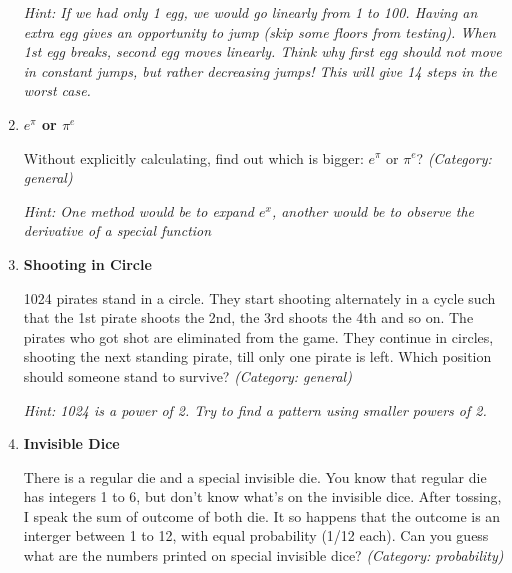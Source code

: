 \begin{enumerate}
\small\emph{Hint: If we had only 1 egg, we would go linearly from 1 to 100. Having an extra egg gives an opportunity to jump (skip some floors from testing). When 1st egg breaks, second egg moves linearly. Think why first egg should not move in constant jumps, but rather decreasing jumps! This will give 14 steps in the worst case.}





\item \textbf{$e^\pi$ or $\pi^e$}

Without explicitly calculating, find out which is bigger: $e^\pi$ or $\pi^e$?
\small\emph{(Category: general)}

\small\emph{Hint: One method would be to expand $e^x$, another would be to observe the derivative of a special function}





\item \textbf{Shooting in Circle}

1024 pirates stand in a circle. They start shooting alternately in a cycle such that the 1st pirate shoots the 2nd, the 3rd shoots the 4th and so on. The pirates who got shot are eliminated from the game. They continue in circles, shooting the next standing pirate, till only one pirate is left. Which position should someone stand to survive?
\small\emph{(Category: general)}

\small\emph{Hint: 1024 is a power of 2. Try to find a pattern using smaller powers of 2.}





\item \textbf{Invisible Dice}

There is a regular die and a special invisible die. You know that regular die has integers 1 to 6, but don't know what's on the invisible dice. After tossing, I speak the sum of outcome of both die. It so happens that the outcome is an interger between 1 to 12, with equal probability (1/12 each). Can you guess what are the numbers printed on special invisible dice?
\small\emph{(Category: probability)}


\end{enumerate}
